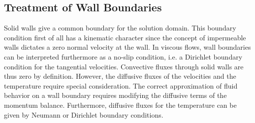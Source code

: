 \subsection{Treatment of Wall Boundaries}
\label{sec:walls}
    
Solid walls give a common boundary for the solution domain. This boundary condition first of all has a kinematic character since the concept of impermeable walls dictates a zero normal velocity at the wall. In viscous flows, wall boundaries can be interpreted furthermore as a no-slip condition, i.e. a Dirichlet boundary condition for the tangential velocities. Convective fluxes through solid walls are thus zero by definition. However, the diffusive fluxes of the velocities and the temperature require special consideration. The correct approximation of fluid behavior on a wall boundary requires modifying the diffusive terms of the momentum balance. Furthermore, diffusive fluxes for the temperature can be given by Neumann or Dirichlet boundary conditions.

